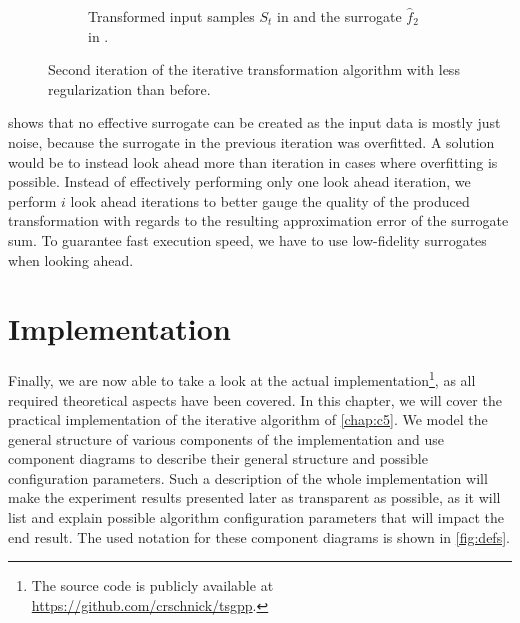 \documentclass[
  a4paper,  %
  twoside,  %
  bibliography=totoc,
  headsepline,
  cleardoublepage=empty,
  parskip=half,
  draft=false
]{scrbook}
\begin{document}
\begin{mdframed}[style=style]
\begin{figure}[H]
\begin{subfigure}{.5\textwidth}
  \caption{Transformed input samples $S_t$ in \darkblue and the surrogate $\hat{f}_2$ in \red.}
\label{fig:pipeline_bad_local_2}
\end{subfigure}
\delimit
\caption{Second iteration of the iterative transformation algorithm with less regularization than before.}
\label{fig:pipeline_bad_2}
\end{figure}
\end{mdframed}
%
 shows that no effective surrogate can be created as the input data is mostly just noise, because the surrogate in the previous iteration was overfitted.
A solution would be to instead look ahead more than iteration in cases where overfitting is possible.
Instead of effectively performing only one look ahead iteration, we perform $i$ look ahead iterations to better gauge the quality of the produced transformation with regards to the resulting approximation error of the surrogate sum.
To guarantee fast execution speed, we have to use low-fidelity surrogates when looking ahead.

\chapter{Implementation}
\label{chap:c6}

Finally, we are now able to take a look at the actual implementation\footnote{The source code is publicly available at \href{https://github.com/crschnick/tsgpp}{https://github.com/crschnick/tsgpp}.}, as all required theoretical aspects have been covered.
In this chapter, we will cover the practical implementation of the iterative algorithm of \cref{chap:c5}.
We model the general structure of various components of the implementation and use component diagrams to describe their general structure and possible configuration parameters.
Such a description of the whole implementation will make the experiment results presented later as transparent as possible, as it will list and explain possible algorithm configuration parameters that will impact the end result.
The used notation for these component diagrams is shown in \cref{fig:defs}.
\end{document}
